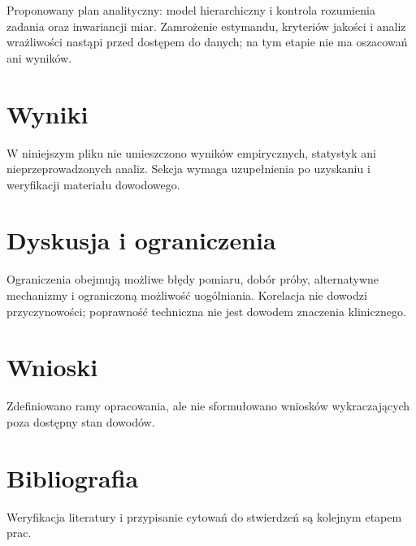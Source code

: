 \documentclass[11pt,a4paper]{article}
\begin{document}
Proponowany plan analityczny: model hierarchiczny i kontrola rozumienia zadania oraz inwariancji miar. Zamrożenie estymandu, kryteriów jakości i analiz wrażliwości nastąpi przed dostępem do danych; na tym etapie nie ma oszacowań ani wyników.

\section{Wyniki}

W niniejszym pliku nie umieszczono wyników empirycznych, statystyk ani nieprzeprowadzonych analiz. Sekcja wymaga uzupełnienia po uzyskaniu i weryfikacji materiału dowodowego.

\section{Dyskusja i ograniczenia}

Ograniczenia obejmują możliwe błędy pomiaru, dobór próby, alternatywne mechanizmy i ograniczoną możliwość uogólniania. Korelacja nie dowodzi przyczynowości; poprawność techniczna nie jest dowodem znaczenia klinicznego.

\section{Wnioski}

Zdefiniowano ramy opracowania, ale nie sformułowano wniosków wykraczających poza dostępny stan dowodów.

\section*{Bibliografia}

Weryfikacja literatury i przypisanie cytowań do stwierdzeń są kolejnym etapem prac.
\end{document}
